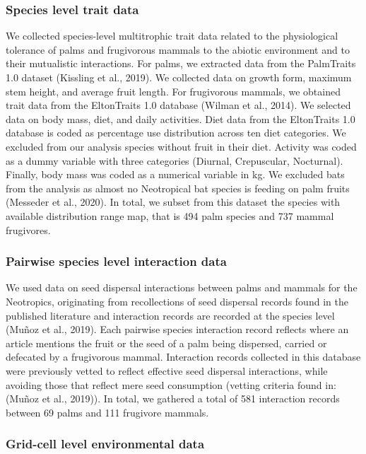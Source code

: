 \documentclass[
]{agujournal2019}
\begin{document}
\subsubsection{Species level trait data}\label{species-level-trait-data}

We collected species-level multitrophic trait data related to the
physiological tolerance of palms and frugivorous mammals to the abiotic
environment and to their mutualistic interactions. For palms, we
extracted data from the PalmTraits 1.0 dataset (Kissling et al., 2019).
We collected data on growth form, maximum stem height, and average fruit
length. For frugivorous mammals, we obtained trait data from the
EltonTraits 1.0 database (Wilman et al., 2014). We selected data on body
mass, diet, and daily activities. Diet data from the EltonTraits 1.0
database is coded as percentage use distribution across ten diet
categories. We excluded from our analysis species without fruit in their
diet. Activity was coded as a dummy variable with three categories
(Diurnal, Crepuscular, Nocturnal). Finally, body mass was coded as a
numerical variable in kg. We excluded bats from the analysis as almost
no Neotropical bat species is feeding on palm fruits (Messeder et al.,
2020). In total, we subset from this dataset the species with available
distribution range map, that is 494 palm species and 737 mammal
frugivores.

\subsubsection{Pairwise species level interaction
data}\label{pairwise-species-level-interaction-data}

We used data on seed dispersal interactions between palms and mammals
for the Neotropics, originating from recollections of seed dispersal
records found in the published literature and interaction records are
recorded at the species level (Muñoz et al., 2019). Each pairwise
species interaction record reflects where an article mentions the fruit
or the seed of a palm being dispersed, carried or defecated by a
frugivorous mammal. Interaction records collected in this database were
previously vetted to reflect effective seed dispersal interactions,
while avoiding those that reflect mere seed consumption (vetting
criteria found in: (Muñoz et al., 2019)). In total, we gathered a total
of 581 interaction records between 69 palms and 111 frugivore mammals.

\subsubsection{Grid-cell level environmental
data}\label{grid-cell-level-environmental-data}
\end{document}
